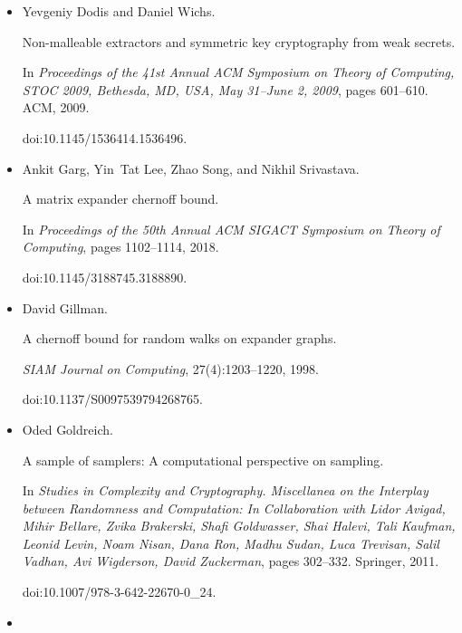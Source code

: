 \begin{itemize}
\item[] 
[15]

Yevgeniy Dodis and Daniel Wichs.


Non-malleable extractors and symmetric key cryptography from weak
secrets.


In \emph{Proceedings of the 41st Annual ACM Symposium on Theory of
Computing, STOC 2009, Bethesda, MD, USA, May 31–June 2, 2009}, pages
601–610. ACM, 2009.


doi:10.1145/1536414.1536496.





\item[] 
[16]

Ankit Garg, Yin Tat Lee, Zhao Song, and Nikhil Srivastava.


A matrix expander chernoff bound.


In \emph{Proceedings of the 50th Annual ACM SIGACT Symposium on Theory
of Computing}, pages 1102–1114, 2018.


doi:10.1145/3188745.3188890.





\item[] 
[17]

David Gillman.


A chernoff bound for random walks on expander graphs.


\emph{SIAM Journal on Computing}, 27(4):1203–1220, 1998.


doi:10.1137/S0097539794268765.





\item[] 
[18]

Oded Goldreich.


A sample of samplers: A computational perspective on sampling.


In \emph{Studies in Complexity and Cryptography. Miscellanea on the
Interplay between Randomness and Computation: In Collaboration with Lidor
Avigad, Mihir Bellare, Zvika Brakerski, Shafi Goldwasser, Shai Halevi, Tali
Kaufman, Leonid Levin, Noam Nisan, Dana Ron, Madhu Sudan, Luca Trevisan,
Salil Vadhan, Avi Wigderson, David Zuckerman}, pages 302–332. Springer,
2011.


doi:10.1007/978-3-642-22670-0\_24.





\item[] 
[19]


\end{itemize}

